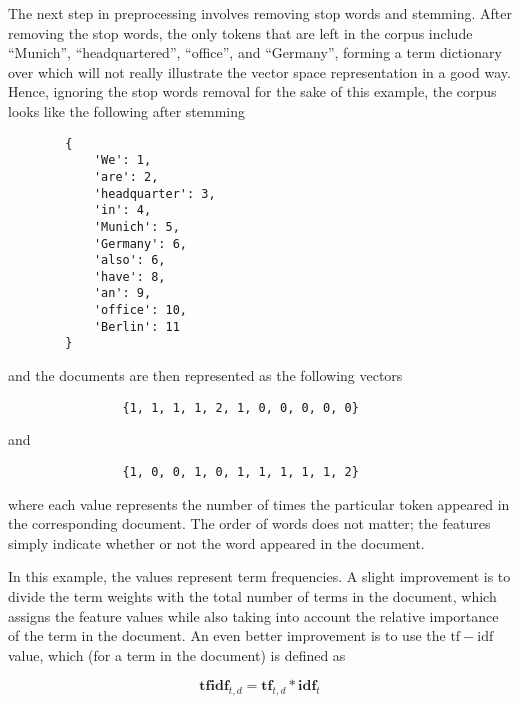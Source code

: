 The next step in preprocessing involves removing stop words and stemming. After removing the stop words, the only tokens that are left in the corpus include ``Munich'', ``headquartered'', ``office'', and ``Germany'', forming a term dictionary over which will not really illustrate the vector space representation in a good way. Hence, ignoring the stop words removal for the sake of this example, the corpus looks like the following after stemming

\begin{center}
    \begin{verbatim}
        {
            'We': 1,
            'are': 2,
            'headquarter': 3,
            'in': 4,
            'Munich': 5,
            'Germany': 6,
            'also': 6,
            'have': 8,
            'an': 9,
            'office': 10,
            'Berlin': 11
        }
    \end{verbatim}
\end{center}

and the documents are then represented as the following vectors

\begin{center}
    \begin{verbatim}
                {1, 1, 1, 1, 2, 1, 0, 0, 0, 0, 0}
    \end{verbatim}
    and
    \begin{verbatim}
                {1, 0, 0, 1, 0, 1, 1, 1, 1, 1, 2}
    \end{verbatim}
\end{center}

where each value represents the number of times the particular token appeared in the corresponding document. The order of words does not matter; the features simply indicate whether or not the word appeared in the document.

In this example, the values represent term frequencies. A slight improvement is to divide the term weights with the total number of terms in the document, which assigns the feature values while also taking into account the relative importance of the term in the document. An even better improvement is to use the $\mathrm{tf-idf}$ value, which (for a term in the document) is defined as

$$\mathbf{tfidf}_{t, d} = \mathbf{tf}_{t, d} * \mathbf{idf}_{t}$$

